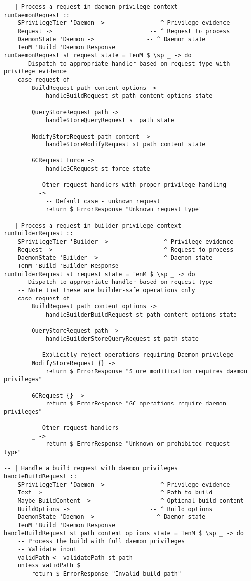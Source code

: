 \documentclass{article}
\begin{document}
\begin{tcolorbox}[title=Ten/Daemon/Server.hs Changes]
\begin{verbatim}
-- | Process a request in daemon privilege context
runDaemonRequest ::
    SPrivilegeTier 'Daemon ->             -- ^ Privilege evidence
    Request ->                            -- ^ Request to process
    DaemonState 'Daemon ->               -- ^ Daemon state
    TenM 'Build 'Daemon Response
runDaemonRequest st request state = TenM $ \sp _ -> do
    -- Dispatch to appropriate handler based on request type with privilege evidence
    case request of
        BuildRequest path content options ->
            handleBuildRequest st path content options state

        QueryStoreRequest path ->
            handleStoreQueryRequest st path state

        ModifyStoreRequest path content ->
            handleStoreModifyRequest st path content state

        GCRequest force ->
            handleGCRequest st force state

        -- Other request handlers with proper privilege handling
        _ ->
            -- Default case - unknown request
            return $ ErrorResponse "Unknown request type"

-- | Process a request in builder privilege context
runBuilderRequest ::
    SPrivilegeTier 'Builder ->             -- ^ Privilege evidence
    Request ->                             -- ^ Request to process
    DaemonState 'Builder ->                -- ^ Daemon state
    TenM 'Build 'Builder Response
runBuilderRequest st request state = TenM $ \sp _ -> do
    -- Dispatch to appropriate handler based on request type
    -- Note that these are builder-safe operations only
    case request of
        BuildRequest path content options ->
            handleBuilderBuildRequest st path content options state

        QueryStoreRequest path ->
            handleBuilderStoreQueryRequest st path state

        -- Explicitly reject operations requiring Daemon privilege
        ModifyStoreRequest {} ->
            return $ ErrorResponse "Store modification requires daemon privileges"

        GCRequest {} ->
            return $ ErrorResponse "GC operations require daemon privileges"

        -- Other request handlers
        _ ->
            return $ ErrorResponse "Unknown or prohibited request type"

-- | Handle a build request with daemon privileges
handleBuildRequest ::
    SPrivilegeTier 'Daemon ->             -- ^ Privilege evidence
    Text ->                               -- ^ Path to build
    Maybe BuildContent ->                 -- ^ Optional build content
    BuildOptions ->                       -- ^ Build options
    DaemonState 'Daemon ->               -- ^ Daemon state
    TenM 'Build 'Daemon Response
handleBuildRequest st path content options state = TenM $ \sp _ -> do
    -- Process the build with full daemon privileges
    -- Validate input
    validPath <- validatePath st path
    unless validPath $
        return $ ErrorResponse "Invalid build path"


\end{verbatim}
\end{tcolorbox}
\end{document}
